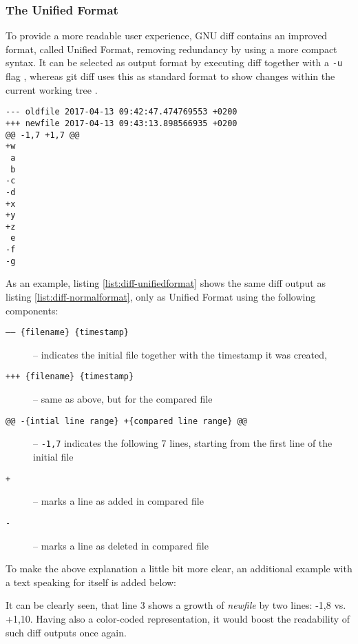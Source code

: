 \vspace{20pt}
\subsubsection{The Unified Format}

To provide a more readable user experience, GNU diff contains an improved format, called Unified Format, removing redundancy by using a more compact syntax. It can be selected as output format by executing diff together with a \texttt{-u} flag \cite[16]{mackenzie2003comparing}, whereas git diff uses this as standard format to show changes within the current working tree \cite{GitDiff}.


\begin{lstlisting}[label={list:diff-unifiedformat}, caption=unified\_format.diff]
--- oldfile	2017-04-13 09:42:47.474769553 +0200
+++ newfile	2017-04-13 09:43:13.898566935 +0200
@@ -1,7 +1,7 @@
+w
 a
 b
-c
-d
+x
+y
+z
 e
-f
-g
\end{lstlisting}

As an example, listing \ref{list:diff-unifiedformat} shows the same diff output as listing \ref{list:diff-normalformat}, only as Unified Format using the following components:

\begin{description}
  \item[\texttt{------ \{filename\} \{timestamp\}}] -- indicates the initial file together with the timestamp it was created,
  \item[\texttt{+++ \{filename\} \{timestamp\}}] -- same as above, but for the compared file
  \item[\texttt{@@ -\{intial line range\} +\{compared line range\} @@}] -- \texttt{-1,7} indicates the following 7 lines, starting from the first line of the initial file
  \item[\texttt{+}] -- marks a line as added in compared file
  \item[\texttt{-}] -- marks a line as deleted in compared file
\end{description}

To make the above explanation a little bit more clear, an additional example with a text speaking for itself is added below:



It can be clearly seen, that line 3 shows a growth of \emph{newfile} by two lines: -1,8 vs. +1,10. Having also a color-coded representation, it would boost the readability of such diff outputs once again.


